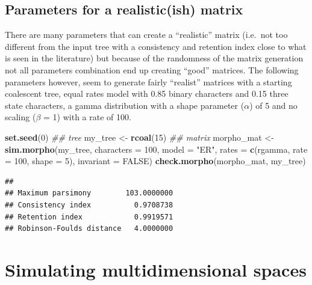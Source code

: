 \documentclass[]{book}
\newenvironment{Shaded}{\begin{snugshade}}{\end{snugshade}}
\newcommand{\CommentTok}[1]{\textcolor[rgb]{0.56,0.35,0.01}{\textit{#1}}}
\newcommand{\DataTypeTok}[1]{\textcolor[rgb]{0.13,0.29,0.53}{#1}}
\newcommand{\DecValTok}[1]{\textcolor[rgb]{0.00,0.00,0.81}{#1}}
\newcommand{\KeywordTok}[1]{\textcolor[rgb]{0.13,0.29,0.53}{\textbf{#1}}}
\newcommand{\NormalTok}[1]{#1}
\newcommand{\OtherTok}[1]{\textcolor[rgb]{0.56,0.35,0.01}{#1}}
\newcommand{\StringTok}[1]{\textcolor[rgb]{0.31,0.60,0.02}{#1}}
\begin{document}
\hypertarget{parameters-for-a-realisticish-matrix}{%
\subsection{Parameters for a realistic(ish) matrix}\label{parameters-for-a-realisticish-matrix}}

There are many parameters that can create a ``realistic'' matrix (i.e.~not too different from the input tree with a consistency and retention index close to what is seen in the literature) but because of the randomness of the matrix generation not all parameters combination end up creating ``good'' matrices.
The following parameters however, seem to generate fairly ``realist'' matrices with a starting coalescent tree, equal rates model with 0.85 binary characters and 0.15 three state characters, a gamma distribution with a shape parameter (\(\alpha\)) of 5 and no scaling (\(\beta\) = 1) with a rate of 100.

\begin{Shaded}
\begin{Highlighting}[]
\KeywordTok{set.seed}\NormalTok{(}\DecValTok{0}\NormalTok{)}
\CommentTok{## tree}
\NormalTok{my_tree <-}\StringTok{ }\KeywordTok{rcoal}\NormalTok{(}\DecValTok{15}\NormalTok{)}
\CommentTok{## matrix}
\NormalTok{morpho_mat <-}\StringTok{ }\KeywordTok{sim.morpho}\NormalTok{(my_tree,}
                         \DataTypeTok{characters =} \DecValTok{100}\NormalTok{,}
                         \DataTypeTok{model =} \StringTok{"ER"}\NormalTok{,}
                         \DataTypeTok{rates =} \KeywordTok{c}\NormalTok{(rgamma, }\DataTypeTok{rate =} \DecValTok{100}\NormalTok{, }\DataTypeTok{shape =} \DecValTok{5}\NormalTok{),}
                         \DataTypeTok{invariant =} \OtherTok{FALSE}\NormalTok{)}
\KeywordTok{check.morpho}\NormalTok{(morpho_mat, my_tree)}
\end{Highlighting}
\end{Shaded}

\begin{verbatim}
##                                     
## Maximum parsimony        103.0000000
## Consistency index          0.9708738
## Retention index            0.9919571
## Robinson-Foulds distance   4.0000000
\end{verbatim}

\hypertarget{simulating-multidimensional-spaces}{%
\section{Simulating multidimensional spaces}\label{simulating-multidimensional-spaces}}
\end{document}
